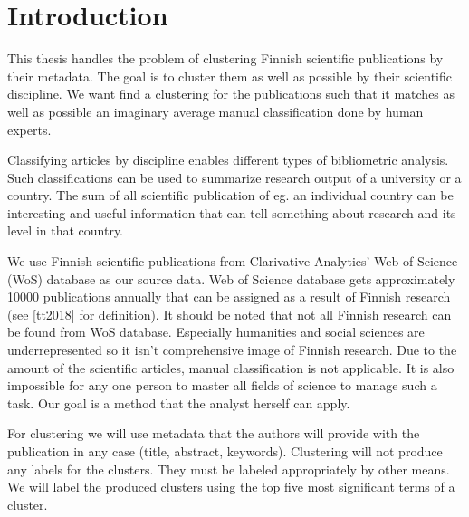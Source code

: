 \chapter{Introduction}
\label{chapter:intro}
This thesis handles the problem of clustering Finnish scientific 
publications by their metadata. The goal is to cluster 
them as well as possible by their scientific discipline. We want 
find a clustering for the publications such that it matches 
as well as possible an imaginary average manual classification 
done by human experts.

Classifying articles by discipline enables different types of 
bibliometric analysis. Such classifications can be used to 
summarize research output of a university or a country.
The sum of all scientific publication of eg. an individual country can be 
interesting and useful information that can tell something about 
research and its level in that country.

We use Finnish scientific publications from Clarivative Analytics' 
Web of Science (WoS) database as our source data. 
Web of Science database gets approximately 10000 publications 
annually that can be assigned as a result of Finnish research (see 
\ref{tt2018} for definition).
It should be noted that not all Finnish research can be found from
WoS database. Especially humanities and social sciences are 
underrepresented so it isn't comprehensive image of Finnish 
research.
Due to the amount of the scientific articles, manual 
classification is not applicable. It is also impossible for any 
one person to master all fields of science to manage such a
task. Our goal is a method that the analyst herself can apply.

For clustering we will use metadata that the authors will provide
with the publication in any case (title, abstract, keywords). 
Clustering will not produce any labels for the clusters. They must
be labeled appropriately by other means. We will label the 
produced clusters using the top five most significant terms of a 
cluster.

